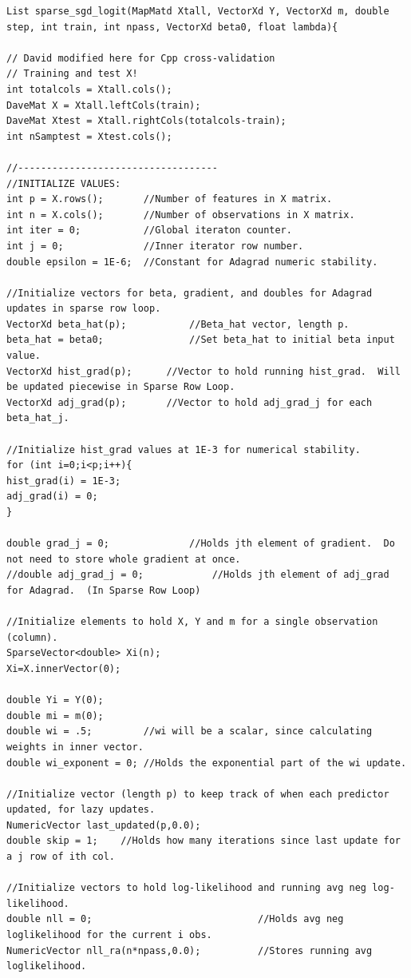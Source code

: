 \documentclass[paper=a4, fontsize=11pt]{scrartcl} %
\numberwithin{equation}{section} %
\numberwithin{figure}{section} %
\numberwithin{table}{section} %
\begin{document}
\begin{lstlisting}
List sparse_sgd_logit(MapMatd Xtall, VectorXd Y, VectorXd m, double step, int train, int npass, VectorXd beta0, float lambda){

// David modified here for Cpp cross-validation
// Training and test X!
int totalcols = Xtall.cols();
DaveMat X = Xtall.leftCols(train);
DaveMat Xtest = Xtall.rightCols(totalcols-train);
int nSamptest = Xtest.cols();

//-----------------------------------
//INITIALIZE VALUES:
int p = X.rows(); 		//Number of features in X matrix.
int n = X.cols(); 		//Number of observations in X matrix.
int iter = 0;			//Global iteraton counter.
int j = 0;				//Inner iterator row number.
double epsilon = 1E-6;	//Constant for Adagrad numeric stability.

//Initialize vectors for beta, gradient, and doubles for Adagrad updates in sparse row loop.
VectorXd beta_hat(p);			//Beta_hat vector, length p.
beta_hat = beta0;				//Set beta_hat to initial beta input value.
VectorXd hist_grad(p);		//Vector to hold running hist_grad.  Will be updated piecewise in Sparse Row Loop.
VectorXd adj_grad(p);		//Vector to hold adj_grad_j for each beta_hat_j.

//Initialize hist_grad values at 1E-3 for numerical stability.
for (int i=0;i<p;i++){
hist_grad(i) = 1E-3;
adj_grad(i) = 0;
}

double grad_j = 0;				//Holds jth element of gradient.  Do not need to store whole gradient at once.
//double adj_grad_j = 0;			//Holds jth element of adj_grad for Adagrad.  (In Sparse Row Loop)

//Initialize elements to hold X, Y and m for a single observation (column).
SparseVector<double> Xi(n);
Xi=X.innerVector(0);

double Yi = Y(0);
double mi = m(0);
double wi = .5;			//wi will be a scalar, since calculating weights in inner vector.
double wi_exponent = 0;	//Holds the exponential part of the wi update.

//Initialize vector (length p) to keep track of when each predictor updated, for lazy updates.
NumericVector last_updated(p,0.0);
double skip = 1;	//Holds how many iterations since last update for a j row of ith col.

//Initialize vectors to hold log-likelihood and running avg neg log-likelihood.
double nll = 0;								//Holds avg neg loglikelihood for the current i obs.	
NumericVector nll_ra(n*npass,0.0);			//Stores running avg loglikelihood.


\end{lstlisting}
\end{document}
